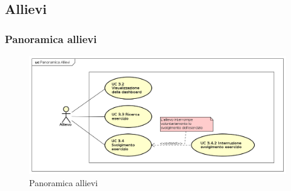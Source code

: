\subsection{Allievi}
\subsubsection{Panoramica allievi}

\begin{figure}[H]
\centering
\includegraphics[width=17cm]{img/Panoramica Allievi.png} 
\caption{Panoramica allievi}\label{fig:31}
\end{figure}


